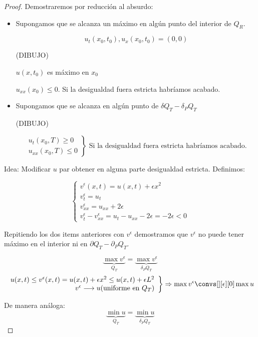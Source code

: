 	 \begin{proof}
	 	Demostraremos por reducción al absurdo:

	 	\begin{itemize}

	 		\item Supongamos que se alcanza un máximo en algún punto del interior de $Q_R$.

	 			\[ u_t(x_0,t_0), u_x(x_0,t_0) = (0,0)\]

	 			(DIBUJO)

	 			$u(x,t_0)$ es máximo en $x_0$

	 			$u_{xx}(x_0) \leq 0$. Si la desigualdad fuera estricta habríamos acabado.

	 		\item Supongamos que se alcanza en algún punto de $\delta Q_T - \delta_P Q_T$

	 			(DIBUJO)

	 			\[ \left. \begin{array}{r}
	 				u_t(x_0,T) \geq 0 \\
	 				u_{xx} (x_0,T) \leq 0
	 			\end{array} \right\} \text{ Si la desigualdad fuera estricta habríamos acabado.}\]

	 	\end{itemize}

	 	Idea: Modificar $u$ par obtener en alguna parte desigualdad estricta. Definimos:

	 	\[ \begin{cases}
	 		v^\epsilon(x,t) = u(x,t) + \epsilon x^2\\
	 		v^\epsilon_t = u_t \\
			v^\epsilon_{xx} = u_{xx} + 2\epsilon \\
			v^\epsilon_t - v^\epsilon_{xx} = u_t - u_{xx} - 2\epsilon = - 2\epsilon < 0
	 	\end{cases}\]

	 	Repitiendo los dos items anteriores con $v^\epsilon$ demostramos que $v^\epsilon$ no puede tener máximo en el interior ni en $\partial Q_T - \partial_P Q_T$.

	 	\[ \underbrace{\max v^\epsilon}_{Q_T} = \underbrace{\max v^\epsilon}_{\delta_P Q_T} \]
	 	\[ \left. \begin{array}{r}
	 		u(x,t) \leq v^\epsilon (x,t) = u(x,t) + \epsilon x^2 \leq u(x,t) + \epsilon L^2 \\
	 		v^\epsilon \longrightarrow u(\text{uniforme en } Q_T)
	 		\end{array} \right\} \Rightarrow \max v^\epsilon \convs[][\epsilon][0] \max u
	 	\]

	 	De manera análoga:
	 	\[ \underbrace{\min u}_{Q_T} = \underbrace{\min u}_{\delta_P Q_T} \]


	 \end{proof}

